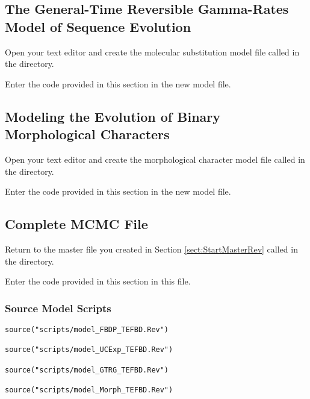 \bigskip

\subsection{The General-Time Reversible Gamma-Rates Model of Sequence Evolution}

{\begin{framed}
Open your text editor and create the molecular substitution model file called {\textcolor{red}{}} in the  directory.

Enter the \Rev code provided in this section in the new model file.
\end{framed}}

\bigskip

\subsection{Modeling the Evolution of Binary Morphological Characters}

{\begin{framed}
Open your text editor and create the morphological character model file called {\textcolor{red}{}} in the  directory.

Enter the \Rev code provided in this section in the new model file.
\end{framed}}

\bigskip

\subsection{Complete MCMC File}

{\begin{framed}
Return to the master \Rev file you created in Section \ref{sect:StartMasterRev} called {\textcolor{red}{}} in the  directory.

Enter the \Rev code provided in this section in this file.
\end{framed}}

\medskip
\subsubsection{Source Model Scripts}
{\tt \begin{snugshade*}
\begin{lstlisting}
source("scripts/model_FBDP_TEFBD.Rev")

source("scripts/model_UCExp_TEFBD.Rev")

source("scripts/model_GTRG_TEFBD.Rev")

source("scripts/model_Morph_TEFBD.Rev")
\end{lstlisting}
\end{snugshade*}}



